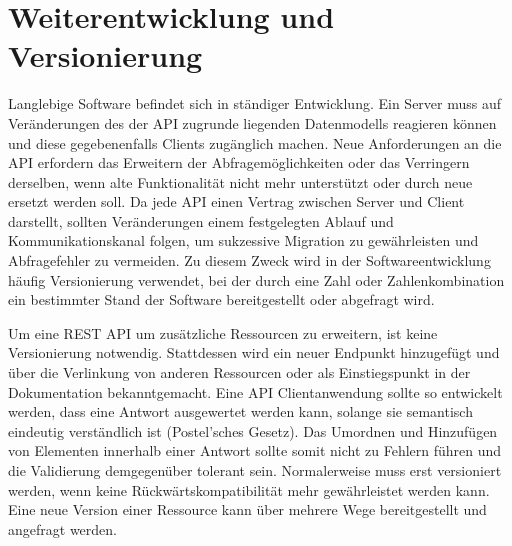 \section{Weiterentwicklung und Versionierung}
\par 
Langlebige Software befindet sich in ständiger Entwicklung.
Ein Server muss auf Veränderungen des der API zugrunde liegenden Datenmodells reagieren können und diese gegebenenfalls Clients zugänglich machen.
Neue Anforderungen an die API erfordern das Erweitern der Abfragemöglichkeiten oder das Verringern derselben, wenn alte Funktionalität nicht mehr unterstützt oder durch neue ersetzt werden soll.
Da jede API einen Vertrag zwischen Server und Client darstellt, sollten Veränderungen einem festgelegten Ablauf und Kommunikationskanal folgen, um sukzessive Migration zu gewährleisten und Abfragefehler zu vermeiden.
Zu diesem Zweck wird in der Softwareentwicklung häufig Versionierung verwendet, bei der durch eine Zahl oder Zahlenkombination ein bestimmter Stand der Software bereitgestellt oder abgefragt wird.
\par
Um eine REST API um zusätzliche Ressourcen zu erweitern, ist keine Versionierung notwendig.
Stattdessen wird ein neuer Endpunkt hinzugefügt und über die Verlinkung von anderen Ressourcen oder als Einstiegspunkt in der Dokumentation bekanntgemacht.
Eine API Clientanwendung sollte so entwickelt werden, dass eine Antwort ausgewertet werden kann, solange sie semantisch eindeutig verständlich ist (Postel'sches Gesetz).
Das Umordnen und Hinzufügen von Elementen innerhalb einer Antwort sollte somit nicht zu Fehlern führen und die Validierung demgegenüber tolerant sein.
Normalerweise muss erst versioniert werden, wenn keine Rückwärtskompatibilität mehr gewährleistet werden kann.
Eine neue Version einer Ressource kann über mehrere Wege bereitgestellt und angefragt werden.
